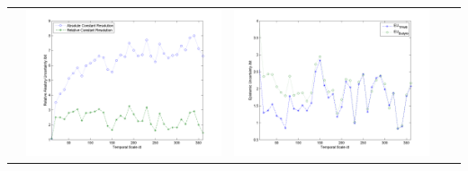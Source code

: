 \documentclass[11pt]{article}
\begin{document}
\begin{table}[H]
{\begin{tabular}{c  c   c   c  c }
&\begin{minipage}{.4\textwidth}\includegraphics[width=\linewidth]{resultgraph/02375500AU.png}\end{minipage}
&\begin{minipage}{.4\textwidth}\includegraphics[width=\linewidth]{resultgraph/02375500EU.png}\end{minipage}
\\

\end{tabular}}
\end{table}
\end{document}
